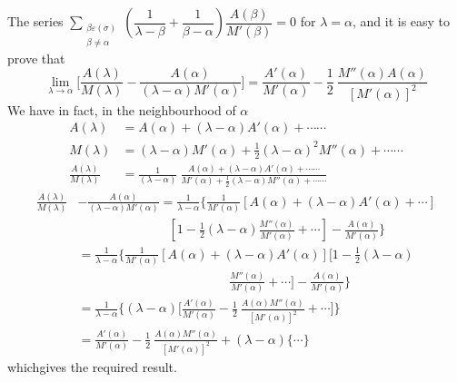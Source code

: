 \begin{remark*}
  The series $\sum\limits_{\substack{\beta \varepsilon  (\sigma ) \\ \beta \neq
      \alpha}} \left(\dfrac{1}{\lambda - \beta} + \dfrac{1}{\beta -
    \alpha}\right)
  \dfrac{A(\beta )}{M' (\beta )} = 0$ for $\lambda = \alpha$, and it
  is easy to prove that  
  $$
  \lim\limits_{\lambda \to \alpha} \Bigg[ \frac{A(\lambda )}{M(\lambda
      )} - \frac{A(\alpha )}{(\lambda - \alpha ) M' (\alpha )} \Bigg]
  = \frac{A' (\alpha )}{M' (\alpha )} - \frac{1}{2} ~ \frac{M''(\alpha
    ) A (\alpha )}{[M' (\alpha )]^2} 
  $$
  We have in fact, in the neighbourhood of $\alpha$
  \begin{align*}
    A(\lambda ) &= A(\alpha ) + (\lambda - \alpha ) A' (\alpha ) +
    \cdots \cdots \\ 
    M(\lambda ) &= (\lambda - \alpha ) M' (\alpha ) + \frac{1}{2}
    (\lambda - \alpha )^2 M''(\alpha )+ \cdots \cdots \\ 
    \frac{A(\lambda )}{M(\lambda )} &= \frac{1}{(\lambda - \alpha
      )} ~ \frac{A(\alpha ) + (\lambda - \alpha ) A' (\alpha ) +
      \cdots \cdots}{M' (\alpha ) + \frac{1}{2} (\lambda -\alpha)M''
      (\alpha ) + \cdots \cdots} 
  \end{align*}
  \begin{align*}
  \frac{A(\lambda )}{M(\lambda )} & - \frac{A(\alpha )}{(\lambda -
    \alpha ) M' (\alpha )}  = \frac{1}{\lambda - \alpha} \Bigg\{
  \frac{1}{M' (\alpha )} [ A(\alpha ) + (\lambda - \alpha ) A' (\alpha
    ) + \cdots]\\ 
       & \hspace{3cm} [ 1- \frac{1}{2} (\lambda - \alpha ) \frac{M'' (\alpha
      )}{M' (\alpha )}+ \cdots ] - \frac{A(\alpha )}{M' (\alpha )}
  \Bigg\}\\ 
    &=\frac{1}{\lambda - \alpha} \Bigg\{ \frac{1}{M' (\alpha )} [
      A(\alpha ) + (\lambda - \alpha ) A' (\alpha )] [ 1- \frac{1}{2}
      (\lambda - \alpha )\\ 
    & \hspace{5cm} \frac{M''(\alpha )}{M' (\alpha )} + \cdots ]
    - \frac{A(\alpha )}{M' (\alpha )} \Bigg\} \\ 
    &= \frac{1}{\lambda - \alpha} \Bigg\{ (\lambda - \alpha ) \Big[
      \frac{A' (\alpha )}{M' (\alpha )} - \frac{1}{2} ~ \frac{A(\alpha
        ) M'' (\alpha )}{[M' (\alpha )]^2} + \cdots \Big] \Bigg\} \\ 
    &= \frac{A' (\alpha )}{M' (\alpha )} - \frac{1}{2} ~
    \frac{A(\alpha ) M'' (\alpha )}{[M' (\alpha )]^2} + (\lambda -
    \alpha ) \Big\{ \cdots \Big\} 
  \end{align*}
  which\pageoriginale gives the required result.
\end{remark*}

